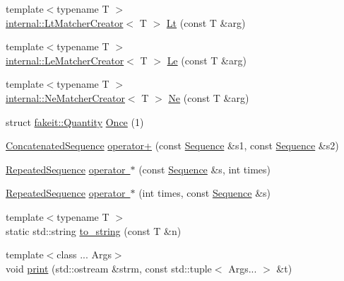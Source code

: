 \begin{DoxyCompactItemize}
{\footnotesize template$<$typename T $>$ }\\\mbox{\hyperlink{structfakeit_1_1internal_1_1LtMatcherCreator}{internal\+::\+Lt\+Matcher\+Creator}}$<$ T $>$ \mbox{\hyperlink{namespacefakeit_ac8b609e3becf3127728c58dd79ef38bf}{Lt}} (const T \&arg)
\item 
{\footnotesize template$<$typename T $>$ }\\\mbox{\hyperlink{structfakeit_1_1internal_1_1LeMatcherCreator}{internal\+::\+Le\+Matcher\+Creator}}$<$ T $>$ \mbox{\hyperlink{namespacefakeit_aaff188e990bef765c3cf3efb75a6cc87}{Le}} (const T \&arg)
\item 
{\footnotesize template$<$typename T $>$ }\\\mbox{\hyperlink{structfakeit_1_1internal_1_1NeMatcherCreator}{internal\+::\+Ne\+Matcher\+Creator}}$<$ T $>$ \mbox{\hyperlink{namespacefakeit_a2c933a0085ac3121fbfe637ace08a7bb}{Ne}} (const T \&arg)
\item 
struct \mbox{\hyperlink{structfakeit_1_1Quantity}{fakeit\+::\+Quantity}} \mbox{\hyperlink{namespacefakeit_ae29e6d25ba1e6364d241a842b81b849f}{Once}} (1)
\item 
\mbox{\hyperlink{classfakeit_1_1ConcatenatedSequence}{Concatenated\+Sequence}} \mbox{\hyperlink{namespacefakeit_a30256848f1ee4d59abebaeaf6534a236}{operator+}} (const \mbox{\hyperlink{classfakeit_1_1Sequence}{Sequence}} \&s1, const \mbox{\hyperlink{classfakeit_1_1Sequence}{Sequence}} \&s2)
\item 
\mbox{\hyperlink{classfakeit_1_1RepeatedSequence}{Repeated\+Sequence}} \mbox{\hyperlink{namespacefakeit_aa07317bf0fd1182d9acd766e1f0eb1a9}{operator $\ast$}} (const \mbox{\hyperlink{classfakeit_1_1Sequence}{Sequence}} \&s, int times)
\item 
\mbox{\hyperlink{classfakeit_1_1RepeatedSequence}{Repeated\+Sequence}} \mbox{\hyperlink{namespacefakeit_a0a70868cdce0e8172fbb0706686326b7}{operator $\ast$}} (int times, const \mbox{\hyperlink{classfakeit_1_1Sequence}{Sequence}} \&s)
\item 
{\footnotesize template$<$typename T $>$ }\\static std\+::string \mbox{\hyperlink{namespacefakeit_a9004af88fd6282c85adc4aa7495b9cbe}{to\+\_\+string}} (const T \&n)
\item 
{\footnotesize template$<$class ... Args$>$ }\\void \mbox{\hyperlink{namespacefakeit_aabf314b4ec582a4a8f365bb6085817df}{print}} (std\+::ostream \&strm, const std\+::tuple$<$ Args... $>$ \&t)
\item 

\end{DoxyCompactItemize}
